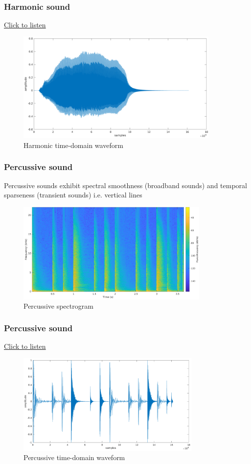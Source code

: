 \documentclass{beamer}
\begin{document}
\begin{frame}
	\frametitle{Harmonic sound}
	\href{run:../audio/viola.wav}{Click to listen}\\
	\begin{figure}
	\includegraphics[width=10cm]{../images/viola_waveform.png}
		\caption{Harmonic time-domain waveform}
	\end{figure}
\end{frame}

\begin{frame}
	\frametitle{Percussive sound}
	Percussive sounds exhibit spectral smoothness (broadband sounds) and temporal sparseness (transient sounds) i.e. vertical lines\\
	\begin{figure}
	\includegraphics[height=5cm]{../images/drumspecgram.png}
		\caption{Percussive spectrogram}
	\end{figure}
\end{frame}

\begin{frame}
	\frametitle{Percussive sound}
	\href{run:../audio/drum.wav}{Click to listen}\\
	\begin{figure}
	\includegraphics[height=5cm]{../images/drum_waveform.png}
		\caption{Percussive time-domain waveform}
	\end{figure}
\end{frame}
\end{document}
